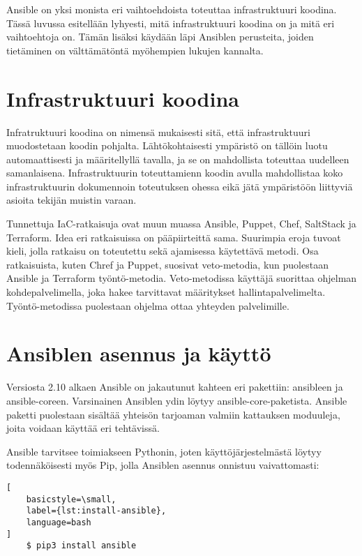 Ansible on yksi monista eri vaihtoehdoista toteuttaa infrastruktuuri koodina.
Tässä luvussa esitellään lyhyesti, mitä infrastruktuuri koodina on ja
mitä eri vaihtoehtoja on. Tämän lisäksi käydään läpi Ansiblen perusteita,
joiden tietäminen on välttämätöntä myöhempien lukujen kannalta.

\section{Infrastruktuuri koodina}

Infratruktuuri koodina on nimensä mukaisesti sitä, että infrastruktuuri
muodostetaan koodin pohjalta. Lähtökohtaisesti ympäristö on tällöin
luotu automaattisesti ja määritellyllä tavalla, ja se on mahdollista
toteuttaa uudelleen samanlaisena. Infrastruktuurin toteuttamienn koodin
avulla mahdollistaa koko infrastruktuurin dokumennoin toteutuksen ohessa
eikä jätä ympäristöön liittyviä asioita tekijän muistin varaan.
\parencite{KiefMorris2020IaC2}

Tunnettuja IaC-ratkaisuja ovat muun muassa Ansible, Puppet, Chef, SaltStack
ja Terraform. Idea eri ratkaisuissa on pääpiirteittä sama. Suurimpia eroja
tuvoat kieli, jolla ratkaisu on toteutettu sekä ajamisessa käytettävä
metodi. Osa ratkaisuista, kuten Chref ja Puppet, suosivat veto-metodia,
kun puolestaan Ansible ja Terraform työntö-metodia. Veto-metodissa
käyttäjä suorittaa ohjelman kohdepalvelimella, joka hakee tarvittavat
määritykset hallintapalvelimelta. Työntö-metodissa puolestaan ohjelma
ottaa yhteyden palvelimille.

\section{Ansiblen asennus ja käyttö}

Versiosta 2.10 alkaen Ansible on jakautunut kahteen eri pakettiin:
ansibleen ja ansible-coreen. Varsinainen Ansiblen ydin löytyy
ansible-core-paketista. Ansible paketti puolestaan sisältää yhteisön
tarjoaman valmiin kattauksen moduuleja, joita voidaan käyttää eri
tehtävissä. \parencite{AnsibleDocs}

Ansible tarvitsee toimiakseen Pythonin, joten käyttöjärjestelmästä
löytyy todennäköisesti myös Pip, jolla Ansiblen asennus onnistuu
vaivattomasti:

\begin{lstlisting}[
    basicstyle=\small,
    label={lst:install-ansible},
    language=bash
]
    $ pip3 install ansible
\end{lstlisting}

